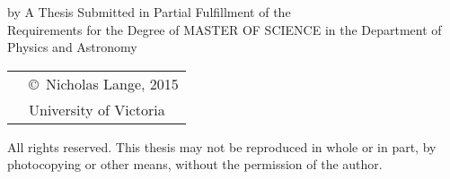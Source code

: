 \pagebreak
{
\centering
\thesistitle
\tpbreak
by
\tpbreak
\nameanddegrees
\tpbreak
A Thesis Submitted in Partial Fulfillment of the \\
Requirements for the Degree of
\tpbreak
MASTER OF SCIENCE
\tpbreak
in the Department of Physics and Astronomy\\
\vfill
\begin{tabular}{cl}
& \copyright\ Nicholas Lange, 2015\\
& \phantom{\copyright} University of Victoria
\end{tabular}
\tpbreak
All rights reserved. This thesis may not be reproduced in whole or in part, by \\
\hfill photocopying or other means, without the permission of the author. 
\hfill
}
\pagebreak
